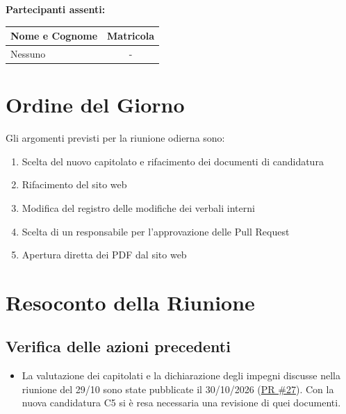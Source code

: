 \documentclass[a4paper, 11pt]{article}
\begin{document}
\vspace{0.5cm}
\textbf{Partecipanti assenti:} \\
\vspace{0.2cm}
\renewcommand{\arraystretch}{1.2}
\begin{tabularx}{0.8\textwidth}{|X|c|}
\hline
\textbf{Nome e Cognome} & \textbf{Matricola} \\ \hline
Nessuno & - \\ \hline
\end{tabularx}

\vspace{0.5cm}
\section{Ordine del Giorno}
Gli argomenti previsti per la riunione odierna sono:
\begin{enumerate}
    \item Scelta del nuovo capitolato e rifacimento dei documenti di candidatura
    \item Rifacimento del sito web
    \item Modifica del registro delle modifiche dei verbali interni
    \item Scelta di un responsabile per l'approvazione delle Pull Request
    \item Apertura diretta dei PDF dal sito web
\end{enumerate}

\newpage
\section{Resoconto della Riunione}

\subsection{Verifica delle azioni precedenti}
\begin{itemize}
    \item La valutazione dei capitolati e la dichiarazione degli impegni discusse nella riunione del 29/10 sono state pubblicate il 30/10/2026 (\href{https://github.com/BitCrusher-Team/Progetto_SWE_26-27/pull/27}{PR \#27}). Con la nuova candidatura C5 si è resa necessaria una revisione di quei documenti.
\end{itemize}
\end{document}
